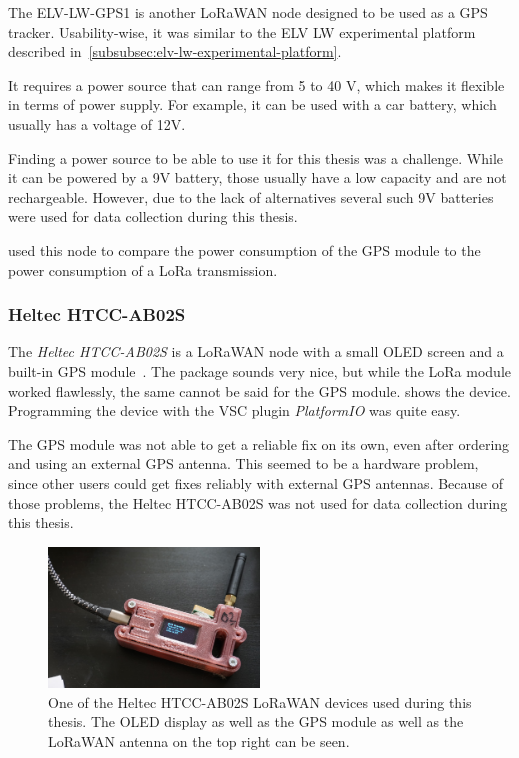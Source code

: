 The ELV-LW-GPS1 is another \ac{LoRaWAN} node designed to be used as a \ac{GPS} tracker.
Usability-wise, it was similar to the ELV LW experimental platform described in~\cref{subsubsec:elv-lw-experimental-platform}.

It requires a power source that can range from 5 to 40 V, which makes it flexible in terms of power supply.
For example, it can be used with a car battery, which usually has a voltage of 12V.

Finding a power source to be able to use it for this thesis was a challenge.
While it can be powered by a 9V battery, those usually have a low capacity and are not rechargeable.
However, due to the lack of alternatives several such 9V batteries were used for data collection during this thesis.

 used this node to compare the power consumption of the \ac{GPS} module to the power consumption of a \ac{LoRa} transmission.

\subsubsection{Heltec HTCC-AB02S}\label{subsubsec:heltec-htcc-ab02s}

The \emph{Heltec HTCC-AB02S} is a \ac{LoRaWAN} node with a small OLED screen and a built-in \ac{GPS} module~\cite{heltec_automation_cubecell_2020}.
The package sounds very nice, but while the \ac{LoRa} module worked flawlessly, the same cannot be said for the \ac{GPS} module.
 shows the device.
Programming the device with the \ac{VSC} plugin \emph{PlatformIO} was quite easy.

The \ac{GPS} module was not able to get a reliable fix on its own, even after ordering and using an external GPS antenna.
This seemed to be a hardware problem, since other users could get fixes reliably with external \ac{GPS} antennas.
Because of those problems, the Heltec HTCC-AB02S was not used for data collection during this thesis.

\begin{figure}[htbp]
    \centering
    \includegraphics[width=0.5\textwidth]{pictures/hardware/gps-nodes/HTCC-AB02S.jpg}
    \caption{
        One of the Heltec HTCC-AB02S \ac{LoRaWAN} devices used during this thesis.
        The \ac{OLED} display as well as the \ac{GPS} module as well as the \ac{LoRaWAN} antenna on the top right can be seen.
    }\label{pic:heltec-htcc-ab02s}
\end{figure}

